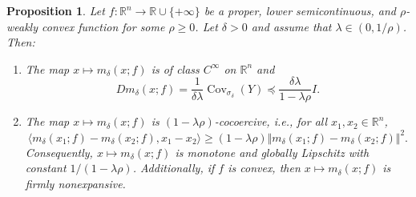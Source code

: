 \documentclass[11pt]{article}
\newcommand{\1}{\mathds{1}}
\newtheorem{proposition}[theorem]{Proposition}
\theoremstyle{definition}
\theoremstyle{remark}
\theoremstyle{definition}
\begin{document}
\begin{proposition}\label{nonexpansive}
Let $f\colon \mathbb{R}^n \to \mathbb{R}\cup \{+\infty\}$ be a proper, lower semicontinuous, and $\rho$-weakly convex function for some $\rho\geq 0$. Let $\delta>0$ and assume that $\lambda \in (0,1/\rho)$. Then:
\begin{enumerate}
    \item[(i)] The map $x\mapsto m_{\delta}(x;f)$ is of class $C^{\infty}$ on $\mathbb{R}^n$ and 
    $$Dm_{\delta}(x;f)=\frac{1}{\delta \lambda} \operatorname{Cov}_{\sigma_{\delta}}(Y)\preceq
\frac{\delta\lambda}{1-\lambda\rho} I.$$
    \item[(ii)] The map $x\mapsto m_{\delta}(x; f)$ is $(1-\lambda\rho)$-cocoercive, i.e., for all $x_1, x_2 \in \mathbb{R}^n$,
$$
\langle m_{\delta}(x_1; f) - m_{\delta}(x_2; f), x_1 - x_2 \rangle \geq (1-\lambda \rho) \Vert m_{\delta}(x_1; f) - m_{\delta}(x_2; f) \Vert^2.
$$
Consequently, $x\mapsto m_{\delta}(x; f)$ is monotone and globally Lipschitz with constant $1/(1-\lambda \rho)$. Additionally, if $f$ is convex, then $x\mapsto m_{\delta}(x; f)$ is firmly nonexpansive.
\end{enumerate}
\end{proposition}
\end{document}
